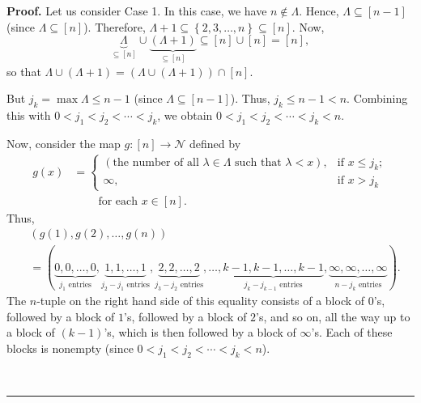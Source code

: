 \documentclass[numbers=enddot,12pt,final,onecolumn,notitlepage]{scrartcl}%
\theoremstyle{definition}
\newenvironment{proof}[1][Proof]{\noindent\textbf{#1.} }{\ \rule{0.5em}{0.5em}}
\newenvironment{verlong}{}{}
\begin{document}
\begin{verlong}
\begin{proof}
Let us consider Case 1. In this case, we have $n\notin\Lambda$. Hence,
$\Lambda\subseteq\left[  n-1\right]  $ (since $\Lambda\subseteq\left[
n\right]  $). Therefore, $\Lambda+1\subseteq\left\{  2,3,\ldots,n\right\}
\subseteq\left[  n\right]  $. Now,%
\[
\underbrace{\Lambda}_{\subseteq\left[  n\right]  }\cup\underbrace{\left(
\Lambda+1\right)  }_{\subseteq\left[  n\right]  }\subseteq\left[  n\right]
\cup\left[  n\right]  =\left[  n\right]  ,
\]
so that $\Lambda\cup\left(  \Lambda+1\right)  =\left(  \Lambda\cup\left(
\Lambda+1\right)  \right)  \cap\left[  n\right]  $.

But $j_{k}=\max\Lambda\leq n-1$ (since $\Lambda\subseteq\left[  n-1\right]
$). Thus, $j_{k}\leq n-1<n$. Combining this with $0<j_{1}<j_{2}<\cdots<j_{k}$,
we obtain $0<j_{1}<j_{2}<\cdots<j_{k}<n$.

Now, consider the map $g:\left[  n\right]  \rightarrow\mathcal{N}$ defined by%
\begin{align*}
g\left(  x\right)   &  =%
\begin{cases}
\left(  \text{the number of all }\lambda\in\Lambda\text{ such that }%
\lambda<x\right)  , & \text{if }x\leq j_{k};\\
\infty, & \text{if }x>j_{k}%
\end{cases}
\\
&  \ \ \ \ \ \ \ \ \ \ \text{for each }x\in\left[  n\right]  .
\end{align*}
Thus,%
\begin{align*}
&  \left(  g\left(  1\right)  ,g\left(  2\right)  ,\ldots,g\left(  n\right)
\right) \\
&  =\left(  \underbrace{0,0,\ldots,0}_{j_{1}\text{ entries}}%
,\underbrace{1,1,\ldots,1}_{j_{2}-j_{1}\text{ entries}},\underbrace{2,2,\ldots
,2}_{j_{3}-j_{2}\text{ entries}},\ldots,\underbrace{k-1,k-1,\ldots,k-1}%
_{j_{k}-j_{k-1}\text{ entries}},\underbrace{\infty,\infty,\ldots,\infty
}_{n-j_{k}\text{ entries}}\right)  .
\end{align*}
The $n$-tuple on the right hand side of this equality consists of a block of
$0$'s, followed by a block of $1$'s, followed by a block of $2$'s, and so on,
all the way up to a block of $\left(  k-1\right)  $'s, which is then followed
by a block of $\infty$'s. Each of these blocks is nonempty (since
$0<j_{1}<j_{2}<\cdots<j_{k}<n$).


\end{proof}
\end{verlong}
\end{document}
